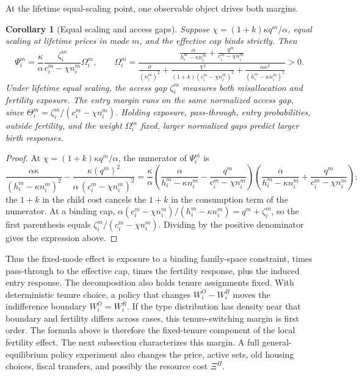 \documentclass[11pt]{article}
\newtheorem{corollary}{Corollary}
\newcommand{\1}{\mathbf 1}
\begin{document}
At the lifetime equal-scaling point, one observable object drives both margins.

\begin{corollary}[Equal scaling and access gaps]
Suppose $\chi=(1+k)\kappa q^m/\alpha$, equal scaling at lifetime prices in mode $m$, and the effective cap binds strictly. Then
\[
\Psi_i^m
=
\frac{\kappa}{\alpha}
\frac{\zeta_i^m}{c_i^m-\chi n_i^m}
\Omega_i^m,
\qquad
\Omega_i^m
=
\frac{
\frac{\alpha}{h_i^m-\kappa n_i^m}+\frac{q^m}{c_i^m-\chi n_i^m}
}{
\frac{\vartheta}{(n_i^m)^2}
+
\frac{\chi^2}{(1+k)(c_i^m-\chi n_i^m)^2}
+
\frac{\alpha\kappa^2}{(h_i^m-\kappa n_i^m)^2}
}
>0.
\]
Under lifetime equal scaling, the access gap $\zeta_i^m$ measures both misallocation and fertility exposure. The entry margin runs on the same normalized access gap, since $\Theta_i^m=\zeta_i^m/(c_i^m-\chi n_i^m)$. Holding exposure, pass-through, entry probabilities, outside fertility, and the weight $\Omega_i^m$ fixed, larger normalized gaps predict larger birth responses.
\end{corollary}

\begin{proof}
At $\chi=(1+k)\kappa q^m/\alpha$, the numerator of $\Psi_i^m$ is
\[
\frac{\alpha\kappa}{(h_i^m-\kappa n_i^m)^2}
-
\frac{\kappa (q^m)^2}{\alpha\,(c_i^m-\chi n_i^m)^2}
=
\frac{\kappa}{\alpha}
\left(\frac{\alpha}{h_i^m-\kappa n_i^m}-\frac{q^m}{c_i^m-\chi n_i^m}\right)
\left(\frac{\alpha}{h_i^m-\kappa n_i^m}+\frac{q^m}{c_i^m-\chi n_i^m}\right):
\]
the $1+k$ in the child cost cancels the $1+k$ in the consumption term of the numerator. At a binding cap, $\alpha(c_i^m-\chi n_i^m)/(h_i^m-\kappa n_i^m)=q^m+\zeta_i^m$, so the first parenthesis equals $\zeta_i^m/(c_i^m-\chi n_i^m)$. Dividing by the positive denominator gives the expression above.
\end{proof}

Thus the fixed-mode effect is exposure to a binding family-space constraint, times pass-through to the effective cap, times the fertility response, plus the induced entry response. The decomposition also holds tenure assignments fixed. With deterministic tenure choice, a policy that changes $W_i^O-W_i^R$ moves the indifference boundary $W_i^O=W_i^R$. If the type distribution has density near that boundary and fertility differs across cases, this tenure-switching margin is first order. The formula above is therefore the fixed-tenure component of the local fertility effect. The next subsection characterizes this margin. A full general-equilibrium policy experiment also changes the price, active sets, old housing choices, fiscal transfers, and possibly the resource cost $\Xi^\Pi$.
\end{document}
